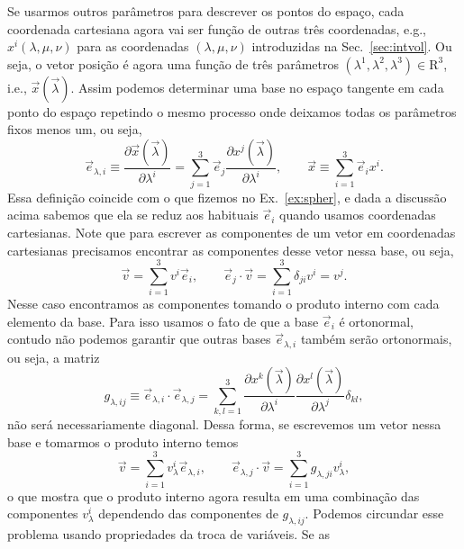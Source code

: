 Se usarmos outros parâmetros para descrever os pontos do espaço, cada coordenada
cartesiana agora vai ser função de outras três coordenadas, e.g.,
$x^i(\lambda,\mu,\nu)$ para as coordenadas $(\lambda,\mu,\nu)$ introduzidas na
Sec.~\ref{sec:intvol}. Ou seja, o vetor posição é agora uma função de três
parâmetros $(\lambda^1,\lambda^2,\lambda^3)\in \mathrm{R}^3$, i.e.,
$\vec{x}(\vec{\lambda})$. Assim podemos determinar uma base no espaço tangente
em cada ponto do espaço repetindo o mesmo processo onde deixamos todas os
parâmetros fixos menos um, ou seja,
\begin{equation}
	\vec{e}_{\lambda,i} \equiv \frac{\partial \vec{x}(\vec{\lambda})}{\partial \lambda^i} = \sum_{j=1}^3\vec{e}_j\frac{\partial x^j(\vec{\lambda})}{\partial \lambda^i},\qquad \vec{x} \equiv \sum_{i=1}^3\vec{e}_i x^i.
\end{equation}
Essa definição coincide com o que fizemos no Ex.~\ref{ex:spher}, e dada a
discussão acima sabemos que ela se reduz aos habituais $\vec{e}_i$  quando
usamos coordenadas cartesianas. Note que para escrever as componentes de um
vetor em coordenadas cartesianas precisamos encontrar as componentes desse vetor
nessa base, ou seja,
\begin{equation}
	\vec{v} = \sum_{i=1}^3 v^i\vec{e}_i, \qquad \vec{e}_j\cdot\vec{v} = \sum_{i=1}^3\delta_{ji}v^i = v^j.
\end{equation}
Nesse caso encontramos as componentes tomando o produto interno com cada
elemento da base. Para isso usamos o fato de que a base $\vec{e}_i$ é
ortonormal, contudo não podemos garantir que outras bases $\vec{e}_{\lambda,i}$
também serão ortonormais, ou seja, a matriz
\begin{equation}\label{mettrans}
	g_{\lambda,ij} \equiv \vec{e}_{\lambda,i}\cdot\vec{e}_{\lambda,j} = \sum_{k,l=1}^3 \frac{\partial x^k(\vec{\lambda})}{\partial \lambda^i}\frac{\partial x^l(\vec{\lambda})}{\partial \lambda^j}\delta_{kl},
\end{equation}
não será necessariamente diagonal. Dessa forma, se escrevemos um vetor nessa
base e tomarmos o produto interno temos
\begin{equation}\label{projcurv}
	\vec{v} = \sum_{i=1}^3 v_\lambda^i\vec{e}_{\lambda,i}, \qquad \vec{e}_{\lambda,j}\cdot\vec{v} = \sum_{i=1}^3 g_{\lambda,ji}v_\lambda^{i},
\end{equation}
o que mostra que o produto interno agora resulta em uma combinação das
componentes $v_\lambda^{i}$ dependendo das componentes de $g_{\lambda,ij}$.
Podemos circundar esse problema usando propriedades da troca de variáveis. Se as
